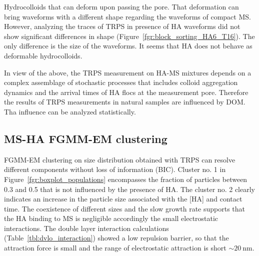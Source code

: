 \documentclass[journal=langd5,manuscript=article]{achemso}
\begin{document}
Hydrocolloids that can deform  upon  passing the pore\cite{Pevarnik2013}. That deformation can bring waveforms with a different shape regarding the waveforms of compact MS. However, analyzing the traces of TRPS in presence of HA waveforms did not show significant differences in shape (Figure~\ref{fgr:block_sorting_HA6_T16}). The only  difference is the size of the waveforms. It seems that HA does not behave as deformable hydrocolloids.

In view of the above, the TRPS measurement on HA-MS mixtures depends on a complex assemblage of stochastic processes that includes colloid aggregation dynamics and the arrival times of HA flocs at the measurement pore. Therefore the results of TRPS measurements in natural samples are influenced by DOM. Tha influence can be analyzed statistically.





\subsection{MS-HA FGMM-EM clustering}



FGMM-EM clustering on size distribution obtained with TRPS can resolve different components without loss of information (BIC). Cluster no. 1 in 
Figure~\ref{fgr:boxplot_populations}
encompasses the fraction of particles between 0.3 and 0.5
that is not influenced by the presence of HA.
The cluster no. 2 clearly indicates an increase in the particle size associated with the [HA] and
contact time. The coexistence of different sizes and the
slow  growth rate supports that the HA binding
to MS is negligible accordingly the small electrostatic interactions\cite{doi:10.1021/es981236u}. The
double layer interaction calculations (Table~\ref{tbl:dvlo_interaction}) showed a low  repulsion barrier,
so that the attraction force is small and the range of electrostatic attraction is short $\sim 20~\mathrm{nm}$.
\end{document}
